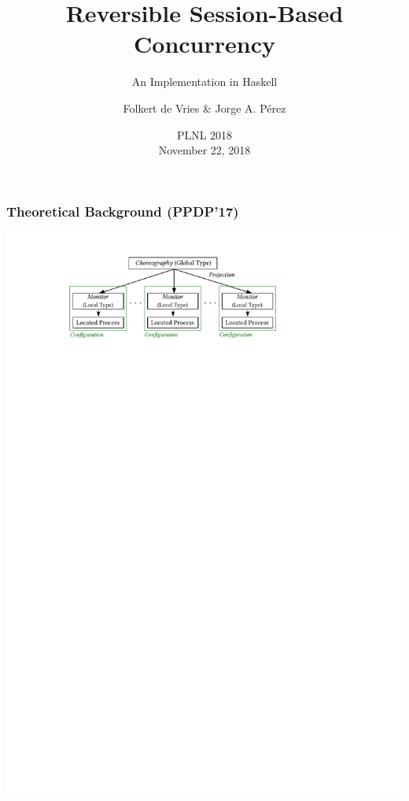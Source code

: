 \documentclass[12pt]{beamer}
\institute{University of Groningen, The Netherlands}
\title[\textcolor{white}{Reversible Session-Based Concurrency}]{Reversible Session-Based Concurrency}
\subtitle{An Implementation in Haskell}
\author[F. de Vries and J.\,A.\,P\'erez (Groningen)]{Folkert de Vries \& Jorge A. Pérez}
\date[November 22, 2018]
{
    PLNL 2018
\\
November 22, 2018
}
\begin{document}
%
%
%


\begin{frame}

\begin{center}
\maketitle
\end{center}

\end{frame}

\begin{frame}
\frametitle{Theoretical Background (PPDP'17)}
\begin{center}
\includegraphics[scale=1.0]{figmodel.pdf}
\end{center}
\end{frame}
    
\end{document}
